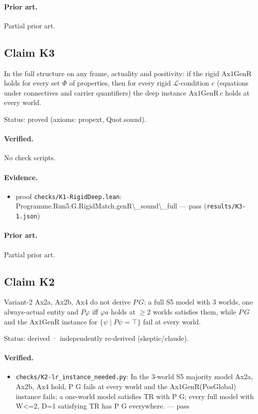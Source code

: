 \documentclass{article}
\begin{document}
\paragraph{Prior art.} Partial prior art.

\subsection*{Claim K3}

In the full structure on any frame, actuality and positivity: if the rigid $\mathrm{Ax1GenR}$ holds for every set $\Phi$ of properties, then for every rigid $\mathcal L$-condition $c$ (equations under connectives and carrier quantifiers) the deep instance $\mathrm{Ax1GenR}\,c$ holds at every world.

Status: proved (axioms: propext, Quot.sound).

\paragraph{Verified.}
No check scripts.

\paragraph{Evidence.}
\begin{itemize}
\item proof \texttt{checks/K1-RigidDeep.lean}: Programme.Run5.G.RigidMatch.genR\textbackslash{}\_sound\textbackslash{}\_full --- pass (\texttt{results/K3-1.json})
\end{itemize}

\paragraph{Prior art.} Partial prior art.

\subsection*{Claim K2}

Variant-2 Ax2a, Ax2b, Ax4 do not derive $P\,G$: a full S5 model with 3 worlds, one always-actual entity and $P\varphi$ iff $\varphi a$ holds at $\ge 2$ worlds satisfies them, while $P\,G$ and the $\mathrm{Ax1GenR}$ instance for $\{\psi\mid P\psi=\top\}$ fail at every world.

Status: derived · independently re-derived (skeptic/claude).

\paragraph{Verified.}
\begin{itemize}
\item \texttt{checks/K2-lr\_instance\_needed.py}: In the 3-world S5 majority model Ax2a, Ax2b, Ax4 hold, P G fails at every world and the Ax1GenR(PosGlobal) instance fails; a one-world model satisfies TR with P G; every full model with \textbar{}W\textbar{}\textless{}=2, \textbar{}D\textbar{}=1 satisfying TR has P G everywhere. --- pass
\end{itemize}
\end{document}
